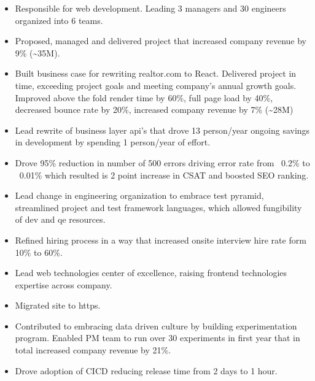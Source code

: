 \documentclass[11pt,a4paper,roman]{moderncv}       %
\begin{document}
\begin{itemize}
    \item Responsible for web development. Leading 3 managers and 30 engineers organized into 6 teams. 
    \item Proposed, managed and delivered project that increased company revenue by 9\% (\textasciitilde35M).
    \item Built business case for rewriting realtor.com to React. Delivered project in time, exceeding project goals and meeting company's annual growth goals. Improved above the fold render time by 60\%, full page load by 40\%, decreased bounce rate by 20\%, increased company revenue by 7\% (\textasciitilde28M)
    \item Lead rewrite of business layer api's that drove 13 person/year ongoing savings in development by spending 1 person/year of effort.
    \item Drove 95\% reduction in number of 500 errors driving error rate from ~0.2\% to ~0.01\% which resulted is 2 point increase in CSAT and boosted SEO ranking.
    \item Lead change in engineering organization to embrace test pyramid, streamlined project and test framework languages, which allowed fungibility of dev and qe resources.
    \item Refined hiring process in a way that increased onsite interview hire rate form 10\% to 60\%.
    \item Lead web technologies center of excellence, raising frontend technologies expertise across company.
    \item Migrated site to https.
    \item Contributed to embracing data driven culture by building experimentation program. Enabled PM team to run over 30 experiments in first year that in total increased company revenue by 21\%.
    \item Drove adoption of CICD reducing release time from 2 days to 1 hour.
\end{itemize}
\vspace{16pt}


\end{document}
